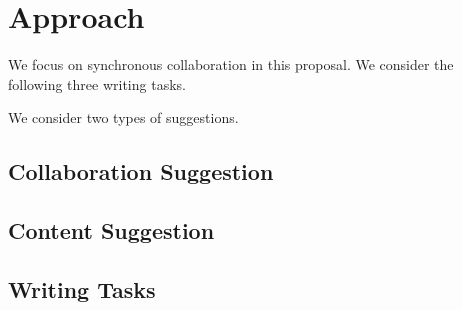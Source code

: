 
\section{Approach}

We focus on synchronous collaboration in this proposal. 
We consider the following three writing tasks.

We consider two types of suggestions.

\subsection{Collaboration Suggestion}

\subsection{Content Suggestion}

\subsection{Writing Tasks}